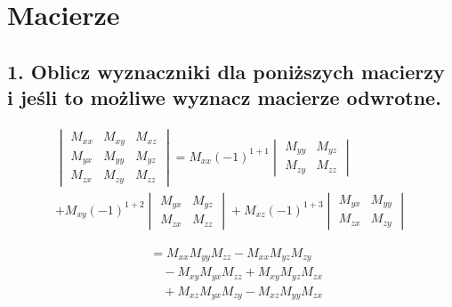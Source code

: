\section{Macierze}


\subsection*{1. Oblicz wyznaczniki dla poniższych macierzy i jeśli to możliwe wyznacz macierze odwrotne.}

\begin{multline*}
    \begin{vmatrix}
    M_{xx} & M_{xy} & M_{xz} \\
    M_{yx} & M_{yy} & M_{yz} \\
    M_{zx} & M_{zy} & M_{zz}
    \end{vmatrix}
    =
    M_{xx}(-1)^{1+1}
    \begin{vmatrix}
    M_{yy} & M_{yz} \\
    M_{zy} & M_{zz}
    \end{vmatrix} \\
    + M_{xy}(-1)^{1+2}
    \begin{vmatrix}
    M_{yx} & M_{yz} \\
    M_{zx} & M_{zz}
    \end{vmatrix}
    + M_{xz}(-1)^{1+3}
    \begin{vmatrix}
    M_{yx} & M_{yy} \\
    M_{zx} & M_{zy}
    \end{vmatrix}
    \end{multline*}
    
    \begin{align*}
    &= M_{xx}M_{yy}M_{zz} - M_{xx}M_{yz}M_{zy} \\
    &\quad - M_{xy}M_{yx}M_{zz} + M_{xy}M_{yz}M_{zx} \\
    &\quad + M_{xz}M_{yx}M_{zy} - M_{xz}M_{yy}M_{zx}
    \end{align*}


